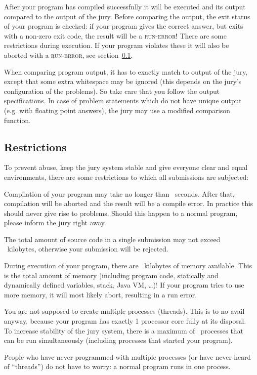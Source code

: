 After your program has compiled successfully it will be executed and
its output compared to the output of the jury. Before comparing the
output, the exit status of your program is checked: if your program
gives the correct answer, but exits with a non-zero exit code, the
result will be a \textsc{run-error}! There are some restrictions during
execution. If your program violates these it will also be aborted
with a \textsc{run-error}, see section~\ref{runlimits}.

When comparing program output, it has to exactly match to output of
the jury, except that some extra whitespace may be ignored (this
depends on the jury's configuration of the problems). So take care
that you follow the output specifications. In case of problem
statements which do not have unique output (e.g. with floating point
answers), the jury may use a modified comparison function.

\subsection{Restrictions}\label{runlimits}

To prevent abuse, keep the jury system stable and give everyone
clear and equal environments, there are some restrictions to which all
submissions are subjected:

\begin{description}
\item[compile time]
Compilation of your program may take no longer than \COMPILETIME\
seconds. After that, compilation will be aborted and the result will
be a compile error. In practice this should never give rise to
problems. Should this happen to a normal program, please inform the
jury right away.

\item[source size]
The total amount of source code in a single submission may not exceed
\SOURCESIZE\ kilobytes, otherwise your submission will be rejected.

\item[memory]
During execution of your program, there are \MEMLIMIT\ kilobytes of
memory available. This is the total amount of memory (including
program code, statically and dynamically defined variables, stack,
Java VM, \dots)! If your program tries to use more memory, it will
most likely abort, resulting in a run error.

\item[number of processes]
You are not supposed to create multiple processes (threads). This is
to no avail anyway, because your program has exactly 1 processor core fully
at its disposal. To increase stability of the jury system, there is a
maximum of \PROCLIMIT\ processes that can be run simultaneously
(including processes that started your program).

People who have never programmed with multiple processes (or have
never heard of ``threads'') do not have to worry: a normal program
runs in one process.

\end{description}

